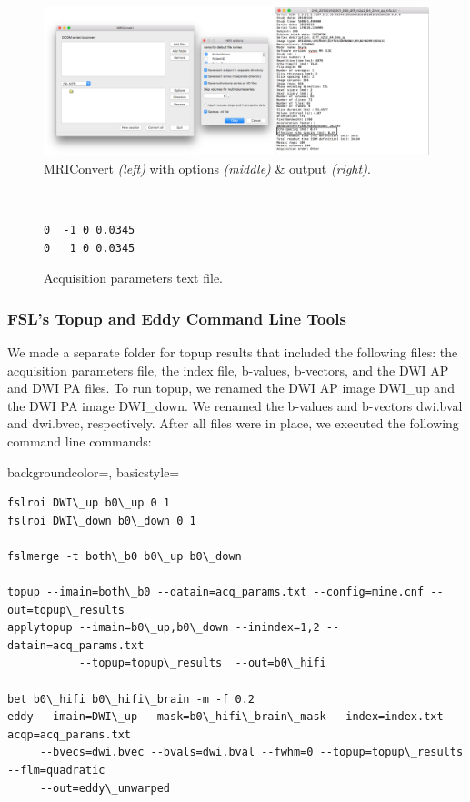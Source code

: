 \begin{figure}[H]
    \centering
    \includegraphics[width=\textwidth]{Figures/combined}
    \caption{MRIConvert \textit{(left)} with options \textit{(middle)} \& output \textit{(right)}.}
    \label{fig:mri_convert}
\end{figure}

\begin{figure}[H]
\centering
{\tt
\begin{varwidth}{\linewidth}
\begin{verbatim}
0  -1 0 0.0345
0   1 0 0.0345
\end{verbatim}
\end{varwidth}
}
\label{fig:acq}
\caption{Acquisition parameters text file.}
\end{figure}

\subsubsection{FSL's Topup and Eddy Command Line Tools}

We made a separate folder for topup results that included the following files: the acquisition parameters file, the index file, b-values, b-vectors, and the DWI AP and DWI PA files. To run topup, we renamed the DWI AP image DWI\_up and the DWI PA image DWI\_down. We renamed the b-values and b-vectors dwi.bval and dwi.bvec, respectively. After all files were in place, we executed the following command line commands:

{
    backgroundcolor=\color{white},
    basicstyle=\scriptsize\color{black}\ttfamily
}

\begin{lstlisting}[style=DOS]
fslroi DWI\_up b0\_up 0 1
fslroi DWI\_down b0\_down 0 1

fslmerge -t both\_b0 b0\_up b0\_down

topup --imain=both\_b0 --datain=acq_params.txt --config=mine.cnf --out=topup\_results
applytopup --imain=b0\_up,b0\_down --inindex=1,2 --datain=acq_params.txt
           --topup=topup\_results  --out=b0\_hifi

bet b0\_hifi b0\_hifi\_brain -m -f 0.2
eddy --imain=DWI\_up --mask=b0\_hifi\_brain\_mask --index=index.txt --acqp=acq_params.txt
     --bvecs=dwi.bvec --bvals=dwi.bval --fwhm=0 --topup=topup\_results --flm=quadratic
     --out=eddy\_unwarped

\end{lstlisting}

